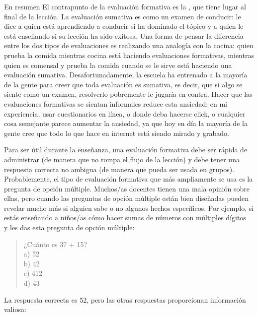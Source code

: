\begin{aside}{En resumen}
El contrapunto de la evaluación formativa
es la ,
que tiene lugar al final de la lección.
La evaluación sumativa es como un examen de conducir:
le dice a quien está aprendiendo a conducir si ha dominado el tópico
y a quien le está enseñando si su lección ha sido exitosa.
Una forma de pensar la diferencia entre los dos tipos de evaluaciones es
realizando una analogía con la cocina:
quien prueba la comida mientras cocina está haciendo evaluaciones formativas,
mientras quien es comensal y prueba la comida cuando se le sirve está haciendo una evaluación sumativa. 
Desafortunadamente,
la escuela ha entrenado a la mayoría de la gente para creer que toda evaluación es sumativa, 
es decir, que si algo se siente como un examen,
resolverlo pobremente le jugaría en contra.
Hacer que las evaluaciones formativas se sientan informales reduce esta ansiedad;
en mi experiencia,
usar cuestionarios en línea, o donde deba hacerse click, o cualquier cosa semejante parece aumentar la ansiedad,
ya que hoy en día la mayoría de la gente cree que todo lo que hace en internet está siendo mirado y grabado.
\end{aside}
 
Para ser útil durante la enseñanza,
una evaluación formativa debe ser rápida de administrar
(de manera que no rompa el flujo de la lección)
y debe tener una respuesta correcta no ambigua
(de manera que pueda ser usada en grupos).
Probablemente, el tipo de evaluación formativa que más ampliamente se usa es
la pregunta de opción múltiple.
Muchos/as docentes tienen una mala opinión sobre ellas,
pero cuando las preguntas de opción múltiple están bien diseñadas
pueden revelar mucho más si alguien sabe o no algunos hechos específicos.
Por ejemplo,
si estás enseñando a niños/as cómo hacer sumas de números con múltiples dígitos~\cite{Ojos2015}
y les das esta pregunta de opción múltiple:

\begin{quote}
  ¿Cuánto es 37 + 15?\\
  a) 52\\
  b) 42\\
  c) 412\\
  d) 43
\end{quote}

\noindent
La respuesta correcta es 52,
pero las otras respuestas proporcionan información valiosa:

